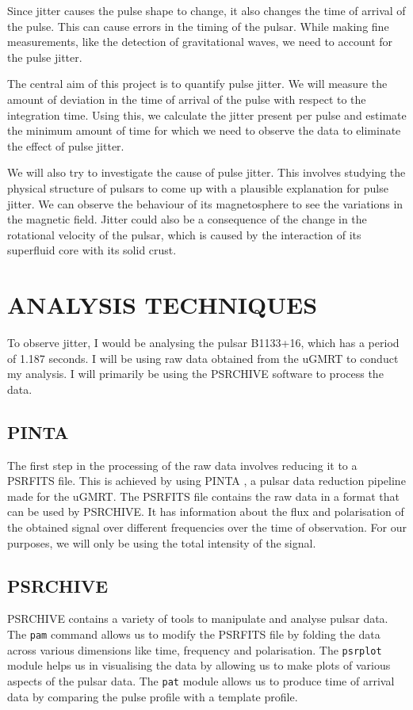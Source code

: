 \documentclass{article_saj}
\begin{document}
Since jitter causes the pulse shape to change, it also changes the time of arrival of the pulse. This can cause errors in the timing of the pulsar. While making fine measurements, like the detection of gravitational waves, we need to account for the pulse jitter. 

The central aim of this project is to quantify pulse jitter. We will measure the amount of deviation in the time of arrival of the pulse with respect to the integration time. Using this, we calculate the jitter present per pulse and estimate the minimum amount of time for which we need to observe the data to eliminate the effect of pulse jitter.

We will also try to investigate the cause of pulse jitter. This involves studying the physical structure of pulsars to come up with a plausible explanation for pulse jitter. We can observe the behaviour of its magnetosphere to see the variations in the magnetic field. Jitter could also be a consequence of the change in the rotational velocity of the pulsar, which is caused by the interaction of its superfluid core with its solid crust.

\section{ANALYSIS TECHNIQUES}
To observe jitter, I would be analysing the pulsar B1133+16, which has a period of 1.187 seconds. I will be using raw data obtained from the uGMRT to conduct my analysis. I will primarily be using the PSRCHIVE software to process the data.

\subsection{PINTA}
The first step in the processing of the raw data involves reducing it to a PSRFITS file. This is achieved by using PINTA \cite{Susobhanan_2021}, a pulsar data reduction pipeline made for the uGMRT. The PSRFITS file contains the raw data in a format that can be used by PSRCHIVE. It has information about the flux and polarisation of the obtained signal over different frequencies over the time of observation. For our purposes, we will only be using the total intensity of the signal.

\subsection{PSRCHIVE}
PSRCHIVE \cite{vanstraten2012pulsar} contains a variety of tools to manipulate and analyse pulsar data. The \texttt{pam} command allows us to modify the PSRFITS file by folding the data across various dimensions like time, frequency and polarisation. The \texttt{psrplot} module helps us in visualising the data by allowing us to make plots of various aspects of the pulsar data. The \texttt{pat} module allows us to produce time of arrival data by comparing the pulse profile with a template profile. 
\end{document}
